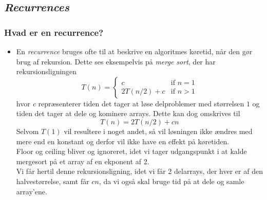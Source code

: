\documentclass{article}
\begin{document}
\subsection*{\textit{Recurrences}}
\subsubsection*{Hvad er en recurrence?}
\begin{itemize}
    \item En \textit{recurrence} bruges ofte til at beskrive en algoritmes køretid, når den gør brug af rekursion. Dette ses eksempelvis på \textit{merge sort}, der har rekursionsligningen
    \[
        T(n) =
        \begin{cases}
            c & \text{if $n = 1$} \\
            2T(n/2) + c & \text{if $n > 1$}
        \end{cases} 
    \]
    hvor \textit{c} repræsenterer tiden det tager at løse delproblemer med størrelsen $1$ og tiden det tager at dele og kominere arrays. Dette kan dog omskrives til
    $$T(n) = 2T(n/2) + cn$$
    Selvom $T(1)$ vil resultere i noget andet, så vil løsningen ikke ændres med mere end en konstant og derfor vil ikke have en effekt på køretiden. \\
    Floor og ceiling bliver og ignoreret, idet vi tager udgangspunkt i at kalde mergesort på et array af en ekponent af 2. \\
    Vi får hertil denne rekursionsligning, idet vi får 2 delarrays, der hver er af den halvestørrelse, samt får $cn$, da vi også skal bruge tid på at dele og samle array'ene.
\end{itemize}
\end{document}
